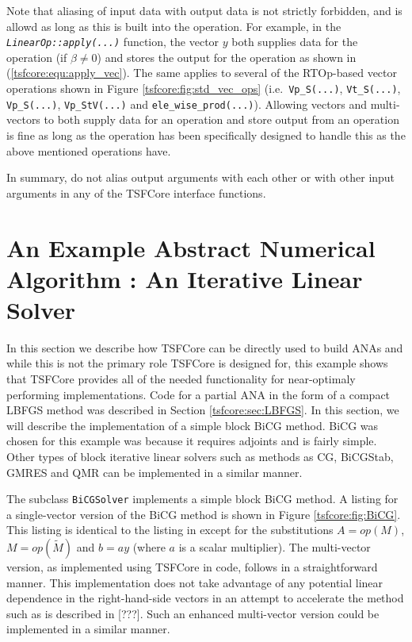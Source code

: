 Note that aliasing of input data with output data is not strictly
forbidden, and is allowd as long as this is built into the operation.
For example, in the {}\texttt{\textit{LinearOp\-::apply(\-...)}}
function, the vector $y$ both supplies data for the operation (if $\beta
\ne 0$) and stores the output for the operation as shown in
(\ref{tsfcore:equ:apply_vec}).  The same applies to several of the
RTOp-based vector operations shown in Figure
{}\ref{tsfcore:fig:std_vec_ops} (i.e.~\texttt{Vp\_S(...)},
{}\texttt{Vt\_S(...)}, {}\texttt{Vp\_S(...)}, {}\texttt{Vp\_StV(...)}
and {}\texttt{ele\_wise\_prod(...)}).  Allowing vectors and
multi-vectors to both supply data for an operation and store output
from an operation is fine as long as the operation has been
specifically designed to handle this as the above mentioned operations
have.

In summary, do not alias output arguments with each other or with
other input arguments in any of the TSFCore interface functions.

%
\section{An Example Abstract Numerical Algorithm : An Iterative Linear Solver}
\label{tsfcore:sec:ANA_iter_solver_example}
%

In this section we describe how TSFCore can be directly used to build
ANAs and while this is not the primary role TSFCore is designed for,
this example shows that TSFCore provides all of the needed
functionality for near-optimaly performing implementations.  Code for
a partial ANA in the form of a compact LBFGS method was described in
Section {}\ref{tsfcore:sec:LBFGS}.  In this section, we will describe
the implementation of a simple block BiCG
{}\cite{ref:tmpls_for_iter_systems} method.  BiCG was chosen for this
example was because it requires adjoints and is fairly simple.  Other
types of block iterative linear solvers such as methods as CG,
BiCGStab, GMRES and QMR {}\cite{ref:tmpls_for_iter_systems} can be
implemented in a similar manner.

The subclass {}\texttt{BiCG\-Solver} implements a simple block BiCG
method.  A listing for a single-vector version of the BiCG method is
shown in Figure {}\ref{tsfcore:fig:BiCG}.  This listing is identical
to the listing in {}\cite{ref:tmpls_for_iter_systems} except for the
substitutions $A = op(M)$, $M = op(\tilde{M})$ and $b =a y$ (where $a$
is a scalar multiplier).  The multi-vector version, as implemented
using TSFCore in code, follows in a straightforward manner.  This
implementation does not take advantage of any potential linear
dependence in the right-hand-side vectors in an attempt to accelerate
the method such as is described in [???].  Such an enhanced
multi-vector version could be implemented in a similar manner.

